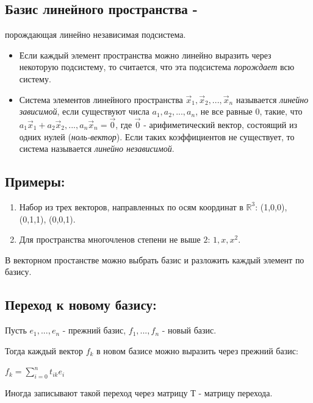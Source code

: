 \documentclass[12pt]{article}
\begin{document}
\subsection{Базис линейного пространства -} порождающая линейно независимая подсистема.

\begin{itemize}
    \item Если каждый элемент пространства можно линейно выразить через некоторую подсистему, то считается, что эта подсистема \textit{порождает} всю систему.

    \item Система элементов линейного пространства $\vec x_{1}, \vec x_{2}, ..., \vec x_{n}$ называется \textit{линейно зависимой}, если существуют числа $a_{1}, a_{2},..., a_{n}$, не все равные 0, такие, что $a_{1}\vec x_{1} + a_{2}\vec x_{2},..., a_{n}\vec x_{n} = \vec 0$, где $\vec 0$ - арифиметический вектор, состоящий из одних нулей (\textit{ноль-вектор}). Если таких коэффициентов не существует, то система называется \textit{линейно независимой}.

\end{itemize}
\subsection{Примеры:}

\begin{enumerate}
    \item Набор из трех векторов, направленных по осям координат в $\mathbb{R}^{3}$:
          (1,0,0), (0,1,1), (0,0,1).

    \item Для пространства многочленов степени не выше $2$: $1, x, x^{2}$.
\end{enumerate}


В векторном простанстве можно выбрать базис и разложить каждый элемент по базису.

\subsection{Переход к новому базису:}

Пусть $e_{1},...,e_{n}$ - прежний базис, $f_{1},...,f_{n}$ - новый базис.

Тогда каждый вектор $f_{k}$ в новом базисе можно выразить через прежний базис:

$f_{k} = \sum\limits_{i=0}^n t_{ik}e_{i}$

Иногда записывают такой переход через матрицу Т - матрицу перехода.
\end{document}
